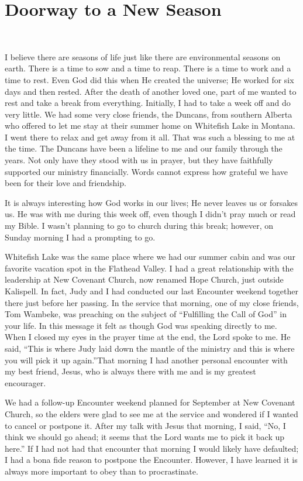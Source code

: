 \documentclass[twoside, 12pt]{book}
\begin{document}
\section{Doorway to a New Season}
\

I believe there are seasons of life just like there are environmental seasons on earth. There is a time to sow and a time to reap. There is a time to work and a time to rest. Even God did this when He created the universe; He worked for six days and then rested. After the death of another loved one, part of me wanted to rest and take a break from everything. Initially, I had to take a week off and do very little. We had some very close friends, the Duncans, from southern Alberta who offered to let me stay at their summer home on Whitefish Lake in Montana. I went there to relax and get away from it all. That was such a blessing to me at the time. The Duncans have been a lifeline to me and our family through the years. Not only have they stood with us in prayer, but they have faithfully supported our ministry financially. Words cannot express how grateful we have been for their love and friendship.

It is always interesting how God works in our lives; He never leaves us or forsakes us. He was with me during this week off, even though I didn’t pray much or read my Bible. I wasn’t planning to go to church during this break; however, on Sunday morning I had a prompting to go.

Whitefish Lake was the same place where we had our summer cabin and was our favorite vacation spot in the Flathead Valley. I had a great relationship with the leadership at New Covenant Church, now renamed Hope Church, just outside Kalispell. In fact, Judy and I had conducted our last Encounter weekend together there just before her passing. In the service that morning, one of my close friends, Tom Wambeke, was preaching on the subject of “Fulfilling the Call of God” in your life. In this message it felt as though God was speaking directly to me. When I closed my eyes in the prayer time at the end, the Lord spoke to me. He said, “This is where Judy laid down the mantle of the ministry and this is where you will pick it up again.”That morning I had another personal encounter with my best friend, Jesus, who is always there with me and is my greatest encourager.

We had a follow-up Encounter weekend planned for September at New Covenant Church, so the elders were glad to see me at the service and wondered if I wanted to cancel or postpone it. After my talk with Jesus that morning, I said, “No, I think we should go ahead; it seems that the Lord wants me to pick it back up here.” If I had not had that encounter that morning I would likely have defaulted; I had a bona fide reason to postpone the Encounter. However, I have learned it is always more important to obey than to procrastinate. 
\end{document}

